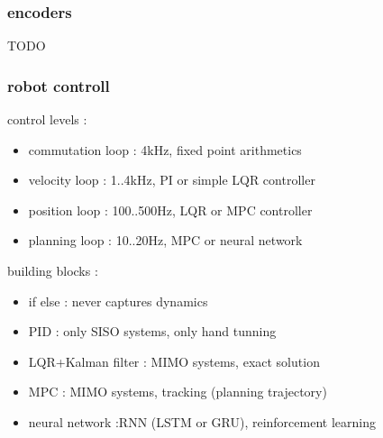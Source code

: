 \documentclass{beamer}
\begin{document}
\begin{frame}

  \frametitle{\bf encoders}
  TODO

\end{frame}



\begin{frame}
  \frametitle{\bf robot controll}

  control levels :
  \begin{itemize}
    \item commutation loop : 4kHz, fixed point arithmetics
    \item velocity  loop   : 1..4kHz, PI or simple LQR controller
    \item position loop    : 100..500Hz, LQR or MPC controller
    \item planning loop    : 10..20Hz, MPC or neural network
  \end{itemize}

  building blocks :
  \begin{itemize}
    \item if else : never captures dynamics
    \item PID     : only SISO systems, only hand tunning
    \item LQR+Kalman filter : MIMO systems, exact solution
    \item MPC : MIMO systems, tracking (planning trajectory)
    \item neural network :RNN (LSTM or GRU), reinforcement learning
  \end{itemize}

\end{frame}
\end{document}
